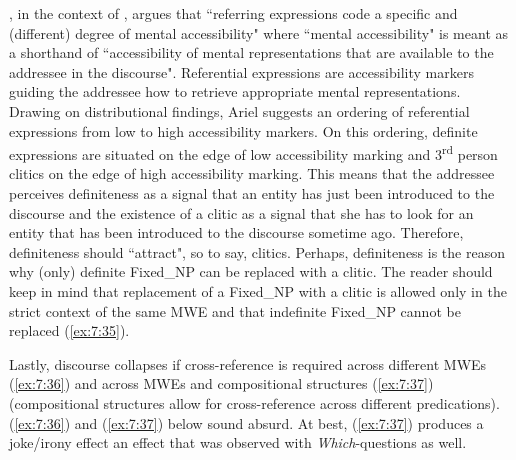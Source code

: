 \documentclass[output=paper]{langsci/langscibook}
\begin{document}
\citet{ariel2001}, in the context of , argues that ``referring expressions code a specific and (different) degree of mental accessibility" where ``mental accessibility" is meant as a shorthand of ``accessibility of mental representations that are available to the addressee in the discourse". Referential expressions are accessibility markers guiding the addressee how to retrieve appropriate mental representations. Drawing on distributional findings, Ariel suggests an ordering of referential expressions from low to high accessibility markers. On this ordering, definite expressions are situated on the edge of low accessibility marking and 3\textsuperscript{rd} person clitics on the edge of high accessibility marking. This means that the addressee perceives definiteness as a signal that an entity has just been introduced to the discourse and the existence of a clitic as a signal that she has to look for an entity that has been introduced to the discourse sometime ago. Therefore, definiteness should ``attract", so to say,  clitics. Perhaps, definiteness is the reason why (only) definite Fixed\_NP can be replaced with a clitic. The reader should keep in mind that replacement of a Fixed\_NP with a clitic is allowed only in the strict context of the same MWE and  that  indefinite Fixed\_NP cannot be replaced (\ref{ex:7:35}).

Lastly, discourse collapses if cross-reference is required across different MWEs (\ref{ex:7:36}) and across MWEs and compositional structures (\ref{ex:7:37}) (compositional structures allow for cross-reference across different predications). (\ref{ex:7:36}) and (\ref{ex:7:37}) below sound absurd. At best, (\ref{ex:7:37}) produces a joke/irony effect \textendash{} an effect that was observed with \textit{Which}-questions as well. 

\z

\z
\end{document}
